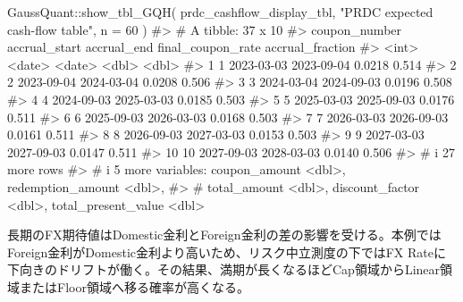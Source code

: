 \documentclass[
  letterpaper,
  DIV=11,
  numbers=noendperiod]{scrreprt}
\newenvironment{Shaded}{\begin{snugshade}}{\end{snugshade}}
\newcommand{\AttributeTok}[1]{\textcolor[rgb]{0.40,0.45,0.13}{#1}}
\newcommand{\CommentTok}[1]{\textcolor[rgb]{0.37,0.37,0.37}{#1}}
\newcommand{\DecValTok}[1]{\textcolor[rgb]{0.68,0.00,0.00}{#1}}
\newcommand{\FunctionTok}[1]{\textcolor[rgb]{0.28,0.35,0.67}{#1}}
\newcommand{\NormalTok}[1]{\textcolor[rgb]{0.00,0.23,0.31}{#1}}
\newcommand{\SpecialCharTok}[1]{\textcolor[rgb]{0.37,0.37,0.37}{#1}}
\newcommand{\StringTok}[1]{\textcolor[rgb]{0.13,0.47,0.30}{#1}}
\begin{document}
\begin{Shaded}
\begin{Highlighting}[]
\NormalTok{GaussQuant}\SpecialCharTok{::}\FunctionTok{show\_tbl\_GQH}\NormalTok{(}
\NormalTok{  prdc\_cashflow\_display\_tbl,}
  \StringTok{"PRDC expected cash{-}flow table"}\NormalTok{,}
  \AttributeTok{n =} \DecValTok{60}
\NormalTok{)}
\CommentTok{\#\textgreater{} \# A tibble: 37 x 10}
\CommentTok{\#\textgreater{}    coupon\_number accrual\_start accrual\_end final\_coupon\_rate accrual\_fraction}
\CommentTok{\#\textgreater{}            \textless{}int\textgreater{} \textless{}date\textgreater{}        \textless{}date\textgreater{}                  \textless{}dbl\textgreater{}            \textless{}dbl\textgreater{}}
\CommentTok{\#\textgreater{}  1             1 2023{-}03{-}03    2023{-}09{-}04             0.0218            0.514}
\CommentTok{\#\textgreater{}  2             2 2023{-}09{-}04    2024{-}03{-}04             0.0208            0.506}
\CommentTok{\#\textgreater{}  3             3 2024{-}03{-}04    2024{-}09{-}03             0.0196            0.508}
\CommentTok{\#\textgreater{}  4             4 2024{-}09{-}03    2025{-}03{-}03             0.0185            0.503}
\CommentTok{\#\textgreater{}  5             5 2025{-}03{-}03    2025{-}09{-}03             0.0176            0.511}
\CommentTok{\#\textgreater{}  6             6 2025{-}09{-}03    2026{-}03{-}03             0.0168            0.503}
\CommentTok{\#\textgreater{}  7             7 2026{-}03{-}03    2026{-}09{-}03             0.0161            0.511}
\CommentTok{\#\textgreater{}  8             8 2026{-}09{-}03    2027{-}03{-}03             0.0153            0.503}
\CommentTok{\#\textgreater{}  9             9 2027{-}03{-}03    2027{-}09{-}03             0.0147            0.511}
\CommentTok{\#\textgreater{} 10            10 2027{-}09{-}03    2028{-}03{-}03             0.0140            0.506}
\CommentTok{\#\textgreater{} \# i 27 more rows}
\CommentTok{\#\textgreater{} \# i 5 more variables: coupon\_amount \textless{}dbl\textgreater{}, redemption\_amount \textless{}dbl\textgreater{},}
\CommentTok{\#\textgreater{} \#   total\_amount \textless{}dbl\textgreater{}, discount\_factor \textless{}dbl\textgreater{}, total\_present\_value \textless{}dbl\textgreater{}}
\end{Highlighting}
\end{Shaded}

長期のFX期待値はDomestic金利とForeign金利の差の影響を受ける。本例ではForeign金利がDomestic金利より高いため、リスク中立測度の下ではFX
Rateに下向きのドリフトが働く。その結果、満期が長くなるほどCap領域からLinear領域またはFloor領域へ移る確率が高くなる。
\end{document}
